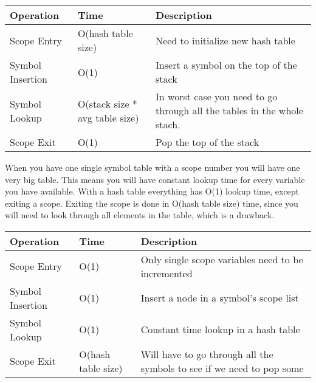 \documentclass[paper=a4, fontsize=11pt]{scrartcl} %
\numberwithin{equation}{section} %
\numberwithin{figure}{section} %
\numberwithin{table}{section} %
\begin{document}
\begin{table}[ht!]
    \begin{center}
    \begin{tabular}{| l | l | p{6cm} |}
    \hline
    Operation  & Time & Description \\
    \hline
    Scope Entry & O(hash table size) & Need to initialize new hash table \\
    \hline
    Symbol Insertion & O(1) & Insert a symbol on the top of the stack \\
    \hline
    Symbol Lookup & O(stack size * avg table size) & In worst case you need to go through all the tables in the whole stach. \\
    \hline
    Scope Exit & O(1) & Pop the top of the stack \\
    \hline
    \end{tabular}
    \end{center}
\end{table}

When you have one single symbol table with a scope number you will have one very big table.
This means you will have constant lookup time for every variable you have available.
With a hash table everything has O(1) lookup time, except exiting a scope.
Exiting the scope is done in O(hash table size) time, since you will need to look through all elements in the table, which is a drawback.

\begin{table}[ht!]
    \begin{center}
    \begin{tabular}{| l | l | p{6cm} |}
    \hline
    Operation  & Time & Description \\
    \hline
    Scope Entry & O(1) & Only single scope variables need to be incremented \\
    \hline
    Symbol Insertion & O(1) & Insert a node in a symbol's scope list \\
    \hline
    Symbol Lookup & O(1) & Constant time lookup in a hash table \\
    \hline
    Scope Exit & O(hash table size) & Will have to go through all the symbols to see if we need to pop some \\
    \hline
    \end{tabular}
    \end{center}
\end{table}
\end{document}
